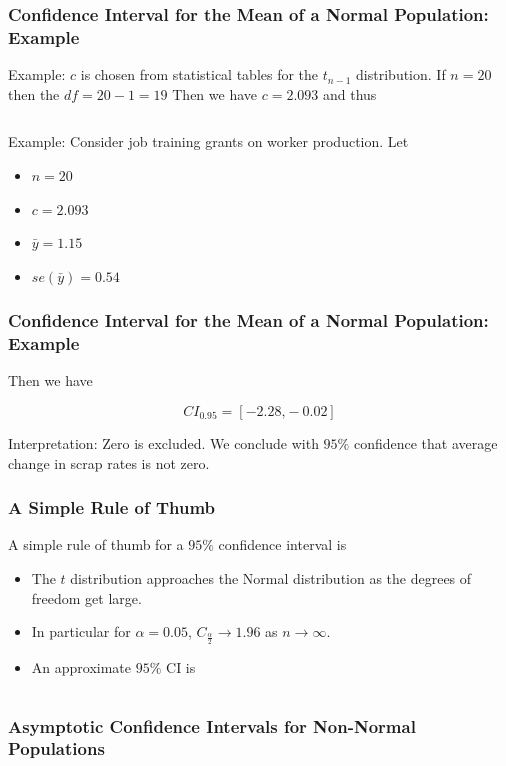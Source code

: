 \documentclass[12pt]{beamer}
\begin{document}
\begin{frame}
\frametitle{Confidence Interval for the Mean of a Normal Population: Example}
Example: $c$ is chosen from statistical tables for the $t_{n-1}$ distribution. If $n=20$ then
the $df = 20 - 1 = 19$ Then we have $c = 2.093$ and thus

\vspace{2mm}
\begin{equation*}
[\bar{y} \pm 2.093 (s / \sqrt{20}) ]
\end{equation*}

\vspace{3mm}
Example: Consider job training grants on worker production. Let

\begin{itemize}
 \item[] $n = 20$
 \item[] $c = 2.093$
 \item[] $\bar{y} = 1.15$
 \item[] $se(\bar{y}) = 0.54$
\end{itemize}
\end{frame}


\begin{frame}
\frametitle{Confidence Interval for the Mean of a Normal Population: Example}
Then we have

\vspace{5mm}
\begin{equation*}
CI_{0.95} = [-2.28 \mbox{,} -0.02]
\end{equation*}

\vspace{5mm}
Interpretation: Zero is excluded. We conclude with $95\%$ confidence that average change
in scrap rates is not zero.
\end{frame}

\begin{frame}
\frametitle{A Simple Rule of Thumb}

A simple rule of thumb for a $95\%$ confidence interval is

\begin{itemize}
 \item The $t$ distribution approaches the Normal distribution as the degrees
       of freedom get large.
 \item In particular for $\alpha=0.05$, $C_{\frac{\alpha}{2}} \rightarrow 1.96$
       as $n \rightarrow \infty$.
 \item An approximate $95\%$ CI is
\end{itemize}

\vspace{3mm}
\begin{equation*}
[\bar{y} \pm z se(\bar{y})]
\end{equation*}

\end{frame}


\begin{frame}
\frametitle{Asymptotic Confidence Intervals for Non-Normal Populations}

\end{frame}
\end{document}
